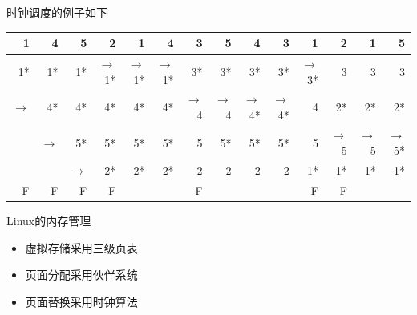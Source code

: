 \begin{example}
    时钟调度的例子如下
    \begin{center}
\begin{tabular}{|r|r|r|r|r|r|r|r|r|r|r|r|r|r|}
\hline
1     & 4     & 5     & 2     & 1     & 4     & 3     & 5     & 4     & 3     & 1     & 2     & 1     & 5 \bigstrut\\
\hline
1*    & 1*    & 1*    & $\to$1*   & $\to$1*   & $\to$1*   & 3*    & 3*    & 3*    & 3*    & $\to$3*   & 3     & 3     & 3 \bigstrut\\
\hline
$\to$     & 4*    & 4*    & 4*    & 4*    & 4*    & $\to$4    & $\to$4    & $\to$4*   & $\to$4*   & 4     & 2*    & 2*    & 2* \bigstrut\\
\hline
      & $\to$     & 5*    & 5*    & 5*    & 5*    & 5     & 5*    & 5*    & 5*    & 5     & $\to$5    & $\to$5    & $\to$5* \bigstrut\\
\hline
      &       & $\to$     & 2*    & 2*    & 2*    & 2     & 2     & 2     & 2     & 1*    & 1*    & 1*    & 1* \bigstrut\\
\hline
F     & F     & F     & F     &       &       & F     &       &       &       & F     & F     &       &  \bigstrut\\
\hline
\end{tabular}%
    \end{center}
\end{example}

Linux的内存管理
\begin{itemize}
    \item 虚拟存储采用三级页表
    \item 页面分配采用伙伴系统
    \item 页面替换采用时钟算法
\end{itemize}